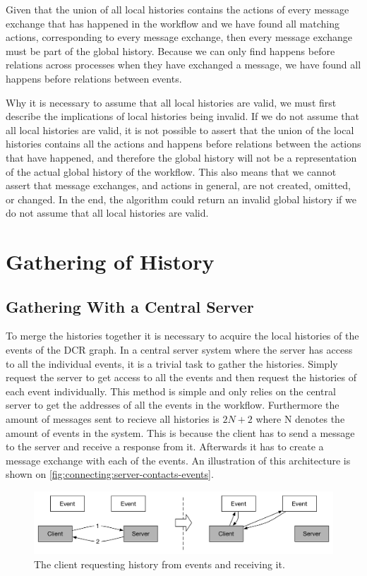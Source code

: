     \newpar Given that the union of all local histories contains the actions of every message exchange that has happened in the workflow and we have found all matching actions, corresponding to every message exchange, then every message exchange must be part of the global history. Because we can only find happens before relations across processes when they have exchanged a message, we have found all happens before relations between events.
    
    \newpar Why it is necessary to assume that all local histories are valid, we must first describe the implications of local histories being invalid. If we do not assume that all local histories are valid, it is not possible to assert that the union of the local histories contains all the actions and happens before relations between the actions that have happened, and therefore the global history will not be a representation of the actual global history of the workflow. This also means that we cannot assert that message exchanges, and actions in general, are not created, omitted, or changed. In the end, the algorithm could return an invalid global history if we do not assume that all local histories are valid.

    \section{Gathering of History}
    \subsection{Gathering With a Central Server}
    To merge the histories together it is necessary to acquire the local histories of the events of the DCR graph. In a central server system where the server has access to all the individual events, it is a trivial task to gather the histories. Simply request the server to get access to all the events and then request the histories of each event individually. This method is simple and only relies on the central server to get the addresses of all the events in the workflow. Furthermore the amount of messages sent to recieve all histories is $2N+2$ where N denotes the amount of events in the system. This is because the client has to send a message to the server and receive a response from it. Afterwards it has to create a message exchange with each of the events. An illustration of this architecture is shown on \autoref{fig:connecting:server-contacts-events}.
    
    \begin{figure}[H]
    	\centering
    	\includegraphics[width=\textwidth]{4connect/images/server-contacts-events.pdf}
    	\caption{The client requesting history from events and receiving it.}
    	\label{fig:connecting:server-contacts-events}
    \end{figure}
    
